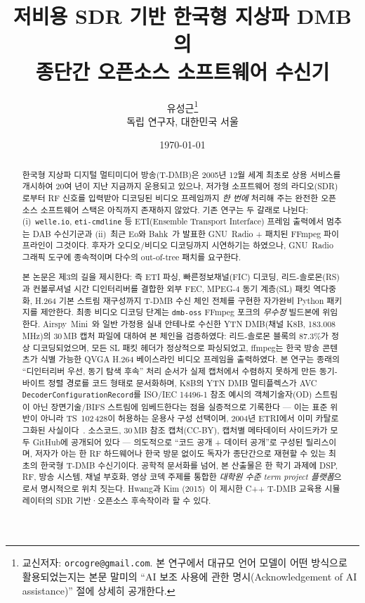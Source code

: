 \documentclass[11pt,a4paper]{article}
\title{저비용 SDR 기반 한국형 지상파 DMB의\\
       종단간 오픈소스 소프트웨어 수신기}
\author{%
  유성근\thanks{교신저자: \texttt{orcogre@gmail.com}.  본 연구에서
    대규모 언어 모델이 어떤 방식으로 활용되었는지는 본문 말미의
    ``AI 보조 사용에 관한 명시(Acknowledgement of AI assistance)''
    절에 상세히 공개한다.}\\
  \small 독립 연구자, 대한민국 서울\\
}
\date{\today}
\begin{document}
\maketitle

\begin{abstract}
한국형 지상파 디지털 멀티미디어 방송(T-DMB)은 2005년 12월 세계 최초로 상용
서비스를 개시하여 20여 년이 지난 지금까지 운용되고 있으나, 저가형
소프트웨어 정의 라디오(SDR)로부터 RF 신호를 입력받아 디코딩된 비디오
프레임까지 \emph{한 번에} 처리해 주는 완전한 오픈소스 소프트웨어 스택은
아직까지 존재하지 않았다.  기존 연구는 두 갈래로 나뉜다: (i)~\texttt{welle.io},
\texttt{eti-cmdline} 등 ETI(Ensemble Transport Interface) 프레임 출력에서
멈추는 DAB 수신기군과 (ii)~최근 Eo와 Bahk~\cite{eo2024tdmb}가 발표한
GNU~Radio + 패치된 FFmpeg 파이프라인이 그것이다.  후자가 오디오/비디오
디코딩까지 시연하기는 하였으나, GNU~Radio 그래픽 도구에 종속적이며 다수의
out-of-tree 패치를 요구한다.

본 논문은 제3의 길을 제시한다: 즉 ETI 파싱, 빠른정보채널(FIC) 디코딩,
리드-솔로몬(RS)과 컨볼루셔널 시간 디인터리버를 결합한 외부 FEC, MPEG-4
동기 계층(SL) 패킷 역다중화, H.264 기본 스트림 재구성까지 T-DMB
수신 체인 전체를 구현한 자가완비 Python 패키지를 제안한다.  최종 비디오
디코딩 단계는 \texttt{dmb-oss} FFmpeg 포크의 \emph{무수정} 빌드본에
위임한다.  Airspy~Mini~\cite{airspy}와 일반 가정용 실내 안테나로 수신한
YTN DMB(채널 K8B, 183.008\,MHz)의 30\,MB 캡처 파일에 대하여 본 체인을
검증하였다: 리드-솔로몬 블록의 87.3\%가 정상 디코딩되었으며, 모든 SL
패킷 헤더가 정상적으로 파싱되었고, ffmpeg는 한국 방송 콘텐츠가 식별
가능한 QVGA H.264 베이스라인 비디오 프레임을 출력하였다.  본 연구는
종래의 ``디인터리버 우선, 동기 탐색 후속'' 처리 순서가 실제 캡처에서
수렴하지 못하게 만든 동기-바이트 정렬 경로를 코드 형태로 문서화하며,
K8B의 YTN DMB 멀티플렉스가 AVC \texttt{DecoderConfigurationRecord}를
ISO/IEC 14496-1 참조 예시의 객체기술자(OD) 스트림이 아닌 장면기술/BIFS
스트림에 임베드한다는 점을 실증적으로 기록한다 --- 이는 표준 위반이
아니라 TS~102\,428이 허용하는 운용사 구성 선택이며, 2004년 ETRI에서
이미 카탈로그화된 사실이다~\cite{lee2004m4smux}.
소스코드, 30\,MB 참조 캡처(CC-BY), 캡처별 메타데이터 사이드카가 모두
GitHub에 공개되어 있다 --- 의도적으로 ``코드 공개 + 데이터 공개''로
구성된 릴리스이며, 저자가 아는 한 RF 하드웨어나 한국 방문 없이도
독자가 종단간으로 재현할 수 있는 최초의 한국형 T-DMB 수신기이다.
공학적 문서화를 넘어, 본 산출물은 한 학기 과제에 DSP, RF, 방송 시스템,
채널 부호화, 영상 코덱 주제를 통합한 \emph{대학원 수준 term project
플랫폼}으로서 명시적으로 위치 짓는다.  Hwang과 Kim
(2015)~\cite{hwang2015simulator}이 제시한 C++ T-DMB 교육용 시뮬레이터의
SDR 기반·오픈소스 후속작이라 할 수 있다.
\end{abstract}
\end{document}
